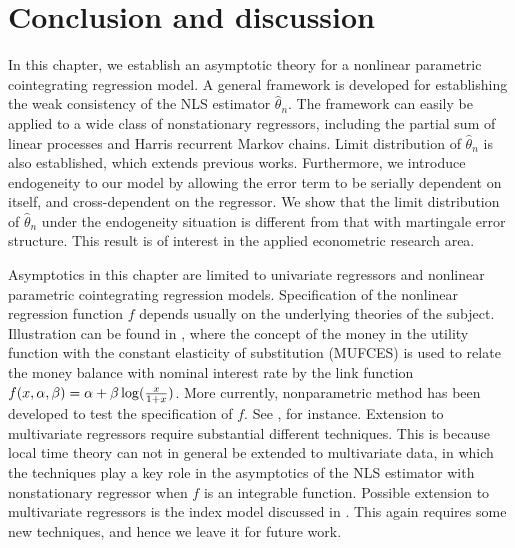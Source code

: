 
\section{Conclusion and discussion} 

In this chapter, we establish an asymptotic theory for a nonlinear parametric cointegrating regression model. A general framework is developed for establishing the weak consistency of the NLS estimator $\hat{\theta}_n$. The framework can easily be applied to a wide class of nonstationary regressors, including the partial sum of linear processes and Harris recurrent Markov chains. Limit distribution of $\hat{\theta}_n$ is also established, which  extends previous works. Furthermore, we introduce endogeneity to our model by allowing the error term to be serially dependent on itself, and cross-dependent on the regressor. We show that the limit distribution of $\hat{\theta}_n$ under the endogeneity situation is different from that with martingale error structure. This result is of interest in the applied econometric research area. 

Asymptotics in this chapter are limited to univariate regressors and 
nonlinear parametric cointegrating regression models. Specification of the nonlinear regression function $f$ depends usually on the underlying theories of the subject. Illustration can be found in  \cite{baekakkarogaki2004}, where  the concept of the money in the utility function with the constant elasticity of substitution (MUFCES) is used  to relate the money balance with nominal interest rate by the link function $f(x, \alpha, \beta) = \alpha + \beta \log(\frac{x}{1 + x})$. More currently, nonparametric method
 has been developed to test the specification of $f$. See \cite{wangphillips2012},  for instance.
Extension to multivariate regressors require substantial different techniques. This is because  local time theory can not in general be extended to multivariate data, in which the techniques play a key role in  the asymptotics of the NLS estimator with nonstationary regressor when $f$ is an integrable function.   Possible extension to multivariate regressors is the index model discussed in \cite{changpark2003}. This again requires some new techniques, and hence we leave it for future  work.


